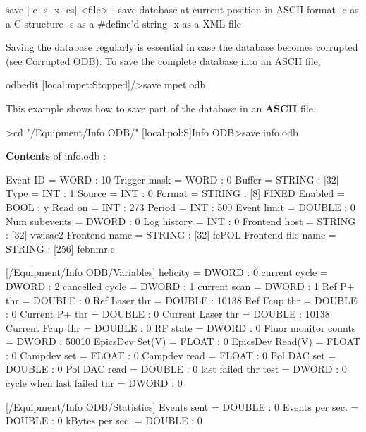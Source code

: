 \begin{DoxyCode}
save [-c -s -x -cs] <file>  - save database at current position
                          in ASCII format
  -c                      as a C structure
  -s                      as a #define'd string
  -x                      as a XML file
\end{DoxyCode}
 Saving the database regularly is essential in case the database becomes corrupted (see \hyperlink{RC_odbedit_examples_RC_odbedit_corrupted}{Corrupted ODB}). To save the complete database into an ASCII file, 
\begin{DoxyCode}
 odbedit
[local:mpet:Stopped]/>save mpet.odb
\end{DoxyCode}
 \par
 This example shows how to save part of the database in an {\bfseries ASCII} file 
\begin{DoxyCode}
>cd "/Equipment/Info ODB/"
[local:pol:S]Info ODB>save info.odb
\end{DoxyCode}
 {\bfseries Contents} of info.odb : 
\begin{DoxyCode}
Event ID = WORD : 10
Trigger mask = WORD : 0
Buffer = STRING : [32] 
Type = INT : 1
Source = INT : 0
Format = STRING : [8] FIXED
Enabled = BOOL : y
Read on = INT : 273
Period = INT : 500
Event limit = DOUBLE : 0
Num subevents = DWORD : 0
Log history = INT : 0
Frontend host = STRING : [32] vwisac2
Frontend name = STRING : [32] fePOL
Frontend file name = STRING : [256] febnmr.c

[/Equipment/Info ODB/Variables]
helicity = DWORD : 0
current cycle = DWORD : 2
cancelled cycle = DWORD : 1
current scan = DWORD : 1
Ref P+ thr = DOUBLE : 0
Ref Laser thr = DOUBLE : 10138
Ref Fcup thr = DOUBLE : 0
Current P+ thr = DOUBLE : 0
Current Laser thr = DOUBLE : 10138
Current Fcup thr = DOUBLE : 0
RF state = DWORD : 0
Fluor monitor counts = DWORD : 50010
EpicsDev Set(V) = FLOAT : 0
EpicsDev Read(V) = FLOAT : 0
Campdev set = FLOAT : 0
Campdev read = FLOAT : 0
Pol DAC set = DOUBLE : 0
Pol DAC read = DOUBLE : 0
last failed thr test = DWORD : 0
cycle when last failed thr = DWORD : 0

[/Equipment/Info ODB/Statistics]
Events sent = DOUBLE : 0
Events per sec. = DOUBLE : 0
kBytes per sec. = DOUBLE : 0
\end{DoxyCode}


